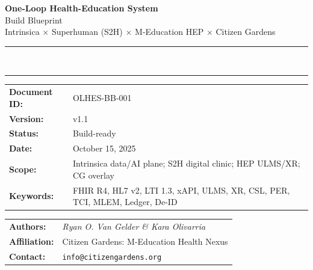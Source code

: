\documentclass[11pt]{article}
\theoremstyle{plain}
\begin{document}
\begin{titlepage}
  \centering


  \vspace*{2.5cm}

  {\Large\textbf{One-Loop Health-Education System}}\\[6pt]
  {\large Build Blueprint}\\[10pt]
  {\normalsize Intrinsica \(\times\) Superhuman (S2H) \(\times\) M-Education HEP \(\times\) Citizen Gardens}\\[20pt]

  \rule{\textwidth}{0.4pt}\\[-4pt]
  \rule{\textwidth}{1.2pt}

  \vspace{1.2cm}

  \begin{tabular}{>{\bfseries}p{3.2cm} p{10.5cm}}
    Document ID: & OLHES-BB-001 \\
    Version:     & v1.1 \\
    Status:      & Build-ready \\
    Date:        & October 15, 2025 \\
    Scope:       & Intrinsica data/AI plane; S2H digital clinic; HEP ULMS/XR; CG overlay \\
    Keywords:    & FHIR R4, HL7 v2, LTI 1.3, xAPI, ULMS, XR, CSL, PER, TCI, MLEM, Ledger, De-ID \\
  \end{tabular}

  \vfill

  \begin{tabular}{>{\bfseries}p{3.2cm} p{10.5cm}}
    Authors:     & \textit{Ryan O. Van Gelder \& Kara Olivarria} \\
    Affiliation: & Citizen Gardens: M-Education Health Nexus \\
    Contact:     & \texttt{info@citizengardens.org} \\
  \end{tabular}


\end{titlepage}
\end{document}
